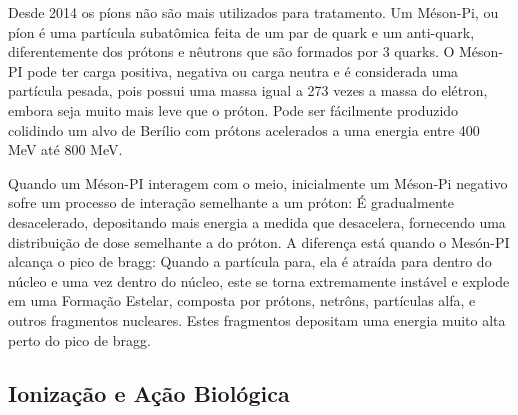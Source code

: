 \documentclass[11pt,a4paper]{article}
\begin{document}
            Desde 2014 os píons não são mais utilizados para tratamento. Um Méson-Pi, ou píon é uma partícula subatômica feita de um par de quark e um anti-quark, diferentemente dos prótons e nêutrons que são formados por 3 quarks.  O Méson-PI pode ter carga positiva, negativa ou carga neutra e é considerada uma partícula pesada, pois possui uma massa igual a 273 vezes a massa do elétron, embora seja muito mais leve que o próton. Pode ser fácilmente produzido colidindo um alvo de Berílio com prótons acelerados a uma energia entre 400 MeV até 800 MeV. 

            Quando um Méson-PI interagem com o meio, inicialmente um Méson-Pi negativo sofre um processo de interação semelhante a um próton: É gradualmente desacelerado, depositando mais energia a medida que desacelera, fornecendo uma distribuição de dose semelhante a do próton. A diferença está quando o Mesón-PI alcança o pico de bragg: Quando a partícula para, ela é atraída para dentro do núcleo e uma vez dentro do núcleo, este se torna extremamente instável e explode em uma Formação Estelar, composta por prótons, netrôns, partículas alfa, e outros fragmentos nucleares. Estes fragmentos depositam uma energia muito alta perto do pico de bragg.
            
        \subsection{Ionização e Ação Biológica}
\end{document}
